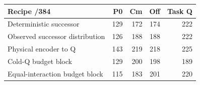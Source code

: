 \begin{tabular}{lrrrr}
\toprule
Recipe /384 & P0 & Cm & Off & Task Q\\
\midrule
Deterministic successor & 129 & 172 & 174 & 222\\
Observed successor distribution & 126 & 188 & 188 & 222\\
Physical encoder to Q & 143 & 219 & 218 & 225\\
Cold-Q budget block & 129 & 200 & 198 & 189\\
Equal-interaction budget block & 115 & 183 & 201 & 220\\
\bottomrule
\end{tabular}
